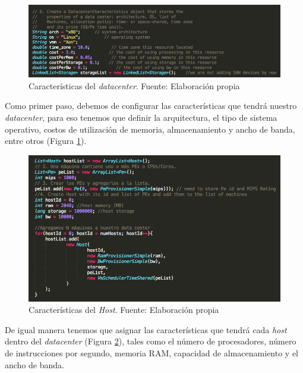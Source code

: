 \setcounter{figure}{7}
\renewcommand\thefigure{\arabic{figure}}
\begin{figure}[h!]
	\centering
	\includegraphics[scale=0.5]{media/caracteristicas_datacenter}
	\caption{Características del \textit{datacenter}. Fuente: Elaboración propia}
	\label{fig:DCar}
\end{figure}


Como primer paso,  debemos de configurar las caracter\'isticas que tendrá nuestro \textit{datacenter}, para eso tenemos que definir la arquitectura, el tipo de sistema operativo, costos de utilizaci\'on de memoria, almacenamiento y ancho de banda, entre otros (Figura \ref{fig:DCar}).


\setcounter{figure}{8}
\renewcommand\thefigure{\arabic{figure}}
\begin{figure}[h!]
	\centering
	\includegraphics[scale=0.5]{media/caracteristicas_host}
	\caption{Características del \textit{Host}. Fuente: Elaboración propia}
	\label{fig:HCar}
	
\end{figure}

De igual manera tenemos que asignar las caracter\'isticas que tendr\'a cada \textit{host} dentro del \textit{datacenter} (Figura \ref{fig:HCar}), tales como el n\'umero de procesadores, n\'umero de instrucciones por segundo, memoria RAM, capacidad de almacenamiento y el ancho de banda.

